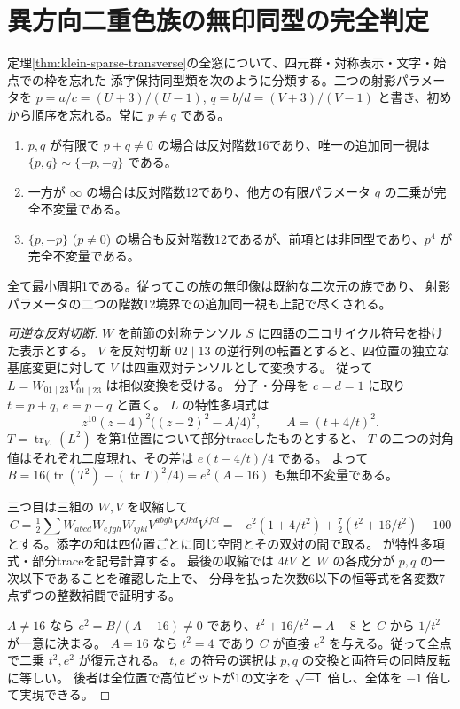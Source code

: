 \section{異方向二重色族の無印同型の完全判定}
\label{sec:transverse-doublet-isomorphism}
\begin{theorem}\label{thm:transverse-doublet-isomorphism}
定理\ref{thm:klein-sparse-transverse}の全窓について、四元群・対称表示・文字・始点での枠を忘れた
添字保持同型類を次のように分類する。二つの射影パラメータを $p=a/c=(U+3)/(U-1)$,
$q=b/d=(V+3)/(V-1)$ と書き、初めから順序を忘れる。常に $p\ne q$ である。
\begin{enumerate}
\item $p,q$ が有限で $p+q\ne0$ の場合は反対階数16であり、唯一の追加同一視は
$\{p,q\}\sim\{-p,-q\}$ である。
\item 一方が $\infty$ の場合は反対階数12であり、他方の有限パラメータ $q$ の二乗が完全不変量である。
\item $\{p,-p\}$ ($p\ne0$) の場合も反対階数12であるが、前項とは非同型であり、$p^4$ が完全不変量である。
\end{enumerate}
全て最小周期1である。従ってこの族の無印像は既約な二次元の族であり、
射影パラメータの二つの階数12境界での追加同一視も上記で尽くされる。
\end{theorem}

\begin{proof}[可逆な反対切断]
$W$ を前節の対称テンソル $S$ に四語の二コサイクル符号を掛けた表示とする。
$V$ を反対切断 $02\mid13$ の逆行列の転置とすると、四位置の独立な基底変更に対して $V$ は四重双対テンソルとして変換する。
従って $L=W_{01\mid23}V_{01\mid23}^{t}$ は相似変換を受ける。
分子・分母を $c=d=1$ に取り $t=p+q$, $e=p-q$ と置く。
$L$ の特性多項式は
\[
 z^{10}(z-4)^2\big((z-2)^2-A/4\big)^2,\qquad A=(t+4/t)^2 .
\]
$T=\operatorname{tr}_{V_1}(L^2)$ を第1位置について部分traceしたものとすると、
$T$ の二つの対角値はそれぞれ二度現れ、その差は $e(t-4/t)/4$ である。
よって $B=16\big(\operatorname{tr}(T^2)-(\operatorname{tr}T)^2/4\big)=e^2(A-16)$ も無印不変量である。

三つ目は三組の $W,V$ を収縮して
\[
 C=\tfrac12\sum W_{abcd}W_{efgh}W_{ijkl}V^{abgh}V^{ejkd}V^{ifcl}
   =-e^2(1+4/t^2)+\tfrac72(t^2+16/t^2)+100
\]
とする。添字の和は四位置ごとに同じ空間とその双対の間で取る。
 が特性多項式・部分traceを記号計算する。
最後の収縮では $4tV$ と $W$ の各成分が $p,q$ の一次以下であることを確認した上で、
分母を払った次数6以下の恒等式を各変数7点ずつの整数補間で証明する。

$A\ne16$ なら $e^2=B/(A-16)\ne0$ であり、$t^2+16/t^2=A-8$ と $C$ から $1/t^2$ が一意に決まる。
$A=16$ なら $t^2=4$ であり $C$ が直接 $e^2$ を与える。従って全点で二乗 $t^2,e^2$ が復元される。
$t,e$ の符号の選択は $p,q$ の交換と両符号の同時反転に等しい。
後者は全位置で高位ビットが1の文字を $\sqrt{-1}$ 倍し、全体を $-1$ 倍して実現できる。
\end{proof}

